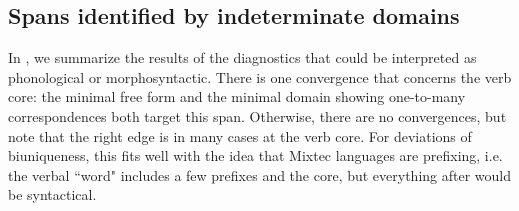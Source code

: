 \documentclass[output=paper]{langscibook}
\begin{document}
\subsection{Spans identified by indeterminate domains}
\label{sub:indeterminatespans}
\largerpage

In , we summarize the results of the diagnostics that could be interpreted as phonological or morphosyntactic.
There is one convergence that concerns the verb core: the minimal free form and the minimal domain showing one-to-many correspondences both target this span.
Otherwise, there are no convergences, but note that the right edge is in many cases at the verb core. 
For deviations of biuniqueness, this fits well with the idea that Mixtec languages are prefixing, i.e. the verbal ``word" includes a few prefixes and the core, but everything after would be syntactical. 

\begin{table}
\caption{Indeterminate diagnostics and their results}
\label{tab:indtests}
\end{table}
\end{document}
